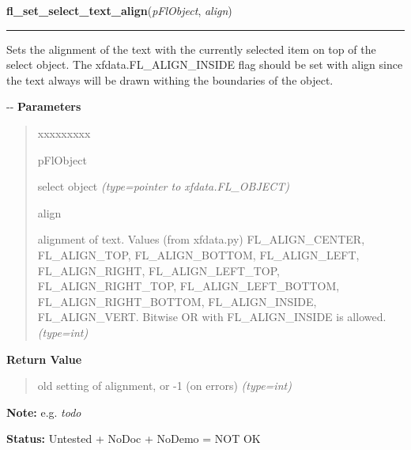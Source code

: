     \vspace{0.5ex}

\hspace{.8\funcindent}\begin{boxedminipage}{\funcwidth}

    \raggedright \textbf{fl\_set\_select\_text\_align}(\textit{pFlObject}, \textit{align})

    \vspace{-1.5ex}

    \rule{\textwidth}{0.5\fboxrule}
\setlength{\parskip}{2ex}

Sets the alignment of the text with the currently selected item on
top of the select object. The xfdata.FL\_ALIGN\_INSIDE flag should be set
with align since the text always will be drawn withing the boundaries of
the object.

-{}-
\setlength{\parskip}{1ex}
      \textbf{Parameters}
      \vspace{-1ex}

      \begin{quote}
        \begin{Ventry}{xxxxxxxxx}

          \item[pFlObject]


select object
            {\it (type=pointer to xfdata.FL\_OBJECT)}

          \item[align]


alignment of text. Values (from xfdata.py) FL\_ALIGN\_CENTER,
FL\_ALIGN\_TOP, FL\_ALIGN\_BOTTOM, FL\_ALIGN\_LEFT, FL\_ALIGN\_RIGHT,
FL\_ALIGN\_LEFT\_TOP, FL\_ALIGN\_RIGHT\_TOP, FL\_ALIGN\_LEFT\_BOTTOM,
FL\_ALIGN\_RIGHT\_BOTTOM, FL\_ALIGN\_INSIDE, FL\_ALIGN\_VERT.
Bitwise OR with FL\_ALIGN\_INSIDE is allowed.
            {\it (type=int)}

        \end{Ventry}

      \end{quote}

      \textbf{Return Value}
    \vspace{-1ex}

      \begin{quote}

old setting of alignment, or -1 (on errors)
      {\it (type=int)}

      \end{quote}

\textbf{Note:} 
e.g. \emph{todo}


\textbf{Status:} 
Untested + NoDoc + NoDemo = NOT OK


    \end{boxedminipage}

